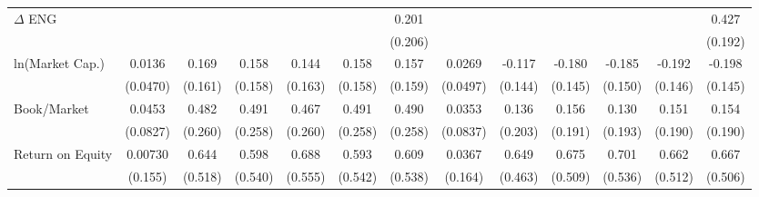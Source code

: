 {\begin{tabular}{l*{12}{c}}
$\Delta$ ENG        &                     &                     &                     &                     &                     &       0.201         &                     &                     &                     &                     &                     &       0.427\sym{**} \\
                    &                     &                     &                     &                     &                     &     (0.206)         &                     &                     &                     &                     &                     &     (0.192)         \\
ln(Market Cap.)     &      0.0136         &       0.169         &       0.158         &       0.144         &       0.158         &       0.157         &      0.0269         &      -0.117         &      -0.180         &      -0.185         &      -0.192         &      -0.198         \\
                    &    (0.0470)         &     (0.161)         &     (0.158)         &     (0.163)         &     (0.158)         &     (0.159)         &    (0.0497)         &     (0.144)         &     (0.145)         &     (0.150)         &     (0.146)         &     (0.145)         \\
Book/Market         &      0.0453         &       0.482\sym{*}  &       0.491\sym{*}  &       0.467\sym{*}  &       0.491\sym{*}  &       0.490\sym{*}  &      0.0353         &       0.136         &       0.156         &       0.130         &       0.151         &       0.154         \\
                    &    (0.0827)         &     (0.260)         &     (0.258)         &     (0.260)         &     (0.258)         &     (0.258)         &    (0.0837)         &     (0.203)         &     (0.191)         &     (0.193)         &     (0.190)         &     (0.190)         \\
Return on Equity    &     0.00730         &       0.644         &       0.598         &       0.688         &       0.593         &       0.609         &      0.0367         &       0.649         &       0.675         &       0.701         &       0.662         &       0.667         \\
                    &     (0.155)         &     (0.518)         &     (0.540)         &     (0.555)         &     (0.542)         &     (0.538)         &     (0.164)         &     (0.463)         &     (0.509)         &     (0.536)         &     (0.512)         &     (0.506)         \\

\end{tabular}}

